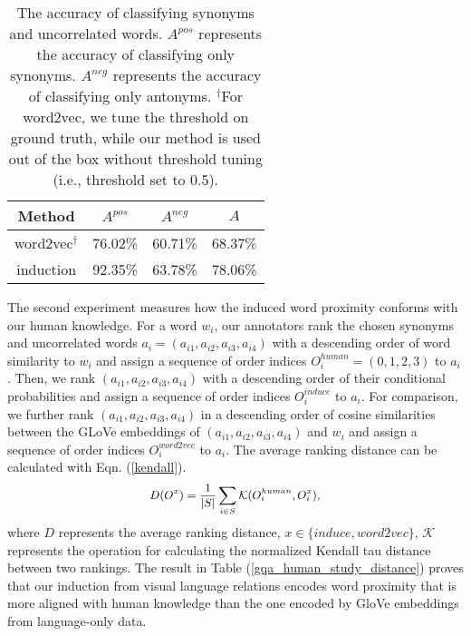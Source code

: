 \documentclass[10pt,twocolumn,letterpaper]{article}
\begin{document}
\begin{table}[t!]
\small
    \centering
    \caption{The accuracy of classifying synonyms and uncorrelated words. $A^{pos}$ represents the accuracy of classifying only synonyms. $A^{neg}$ represents the accuracy of classifying only antonyms. $^{\dagger}$For word2vec, we tune the threshold on ground truth, while our method is used out of the box without threshold tuning (i.e., threshold set to 0.5).}
    \begin{tabular}{c|ccc}
        \toprule
         Method & $A^{pos}$ & $A^{neg}$ & $A$\\
         \midrule
         word2vec$^{\dagger}$  & 76.02\% & 60.71\% & 68.37\% \\
         induction & 92.35\% & 63.78\% & 78.06\% \\
         \bottomrule
    \end{tabular}
    \label{gqa_human_study_accuracy}
\end{table} 
The second experiment measures how the induced word proximity conforms with our human knowledge. For a word $w_i$, our annotators rank the chosen synonyms and uncorrelated words $a_i=(a_{i1}, a_{i2}, a_{i3}, a_{i4})$ with a descending order of word similarity to $w_i$ and assign a sequence of order indices $O_i^{human}=(0,1,2,3)$ to $a_i$. Then, we rank $(a_{i1}, a_{i2}, a_{i3}, a_{i4})$ with a descending order of their conditional probabilities and assign a sequence of order indices $O_i^{induce}$ to $a_i$. For comparison, we further rank $(a_{i1}, a_{i2}, a_{i3}, a_{i4})$ in a descending order of cosine similarities between the GLoVe embeddings of $(a_{i1}, a_{i2}, a_{i3}, a_{i4})$ and $w_i$ and assign a sequence of order indices $O_i^{word2vec}$ to $a_i$. The average ranking distance can be calculated with Eqn. (\ref{kendall}). 
\begin{equation}
\small
\begin{split}
    D(O^x) = \frac{1}{|S|} \sum_{i \in S} \mathcal{K}(O_i^{human},O_i^x),
    \label{kendall}
\end{split}
\end{equation}
where $D$ represents the average ranking distance, $x \in \{induce, word2vec\}$,  $\mathcal{K}$ represents the operation for calculating the normalized Kendall tau distance between two rankings. The result in Table (\ref{gqa_human_study_distance}) proves that our induction from visual language relations encodes word proximity that is more aligned with human knowledge than the one encoded by GloVe embeddings from language-only data. 
\end{document}
